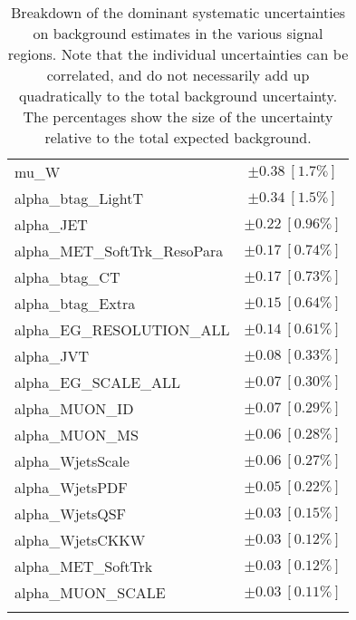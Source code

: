 \begin{table}
\begin{center}
\begin{tabular*}{\textwidth}{@{\extracolsep{\fill}}lc}
mu\_W         & $\pm 0.38\ [1.7\%] $       \\
alpha\_btag\_LightT         & $\pm 0.34\ [1.5\%] $       \\
alpha\_JET         & $\pm 0.22\ [0.96\%] $       \\
alpha\_MET\_SoftTrk\_ResoPara         & $\pm 0.17\ [0.74\%] $       \\
alpha\_btag\_CT         & $\pm 0.17\ [0.73\%] $       \\
alpha\_btag\_Extra         & $\pm 0.15\ [0.64\%] $       \\
alpha\_EG\_RESOLUTION\_ALL         & $\pm 0.14\ [0.61\%] $       \\
alpha\_JVT         & $\pm 0.08\ [0.33\%] $       \\
alpha\_EG\_SCALE\_ALL         & $\pm 0.07\ [0.30\%] $       \\
alpha\_MUON\_ID         & $\pm 0.07\ [0.29\%] $       \\
alpha\_MUON\_MS         & $\pm 0.06\ [0.28\%] $       \\
alpha\_WjetsScale         & $\pm 0.06\ [0.27\%] $       \\
alpha\_WjetsPDF         & $\pm 0.05\ [0.22\%] $       \\
alpha\_WjetsQSF         & $\pm 0.03\ [0.15\%] $       \\
alpha\_WjetsCKKW         & $\pm 0.03\ [0.12\%] $       \\
alpha\_MET\_SoftTrk         & $\pm 0.03\ [0.12\%] $       \\
alpha\_MUON\_SCALE         & $\pm 0.03\ [0.11\%] $       \\
\noalign{\smallskip}\hline\noalign{\smallskip}
\end{tabular*}
\end{center}
\caption[Breakdown of uncertainty on background estimates]{
Breakdown of the dominant systematic uncertainties on background estimates in the various signal regions.
Note that the individual uncertainties can be correlated, and do not necessarily add up quadratically to 
the total background uncertainty. The percentages show the size of the uncertainty relative to the total expected background.
\label{table.results.bkgestimate.uncertainties.VRtt1onEM_cuts}}
\end{table}
%